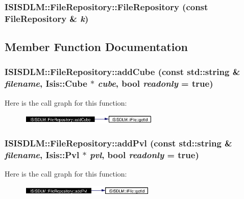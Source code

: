 \subsubsection{\setlength{\rightskip}{0pt plus 5cm}ISISDLM::File\-Repository::File\-Repository (const {\bf File\-Repository} \& {\em k})\hspace{0.3cm}{\tt  [private]}}\label{classISISDLM_1_1FileRepository_d1}




\subsection{Member Function Documentation}
\subsubsection{ ISISDLM::File\-Repository::add\-Cube (const std::string \& {\em filename}, Isis::Cube $\ast$ {\em cube}, bool {\em readonly} = true)}\label{classISISDLM_1_1FileRepository_a1}




Here is the call graph for this function:\begin{figure}[H]
\begin{center}
\leavevmode
\includegraphics[width=187pt]{classISISDLM_1_1FileRepository_a1_cgraph}
\end{center}
\end{figure}
\subsubsection{ ISISDLM::File\-Repository::add\-Pvl (const std::string \& {\em filename}, Isis::Pvl $\ast$ {\em pvl}, bool {\em readonly} = true)}\label{classISISDLM_1_1FileRepository_a2}




Here is the call graph for this function:\begin{figure}[H]
\begin{center}
\leavevmode
\includegraphics[width=182pt]{classISISDLM_1_1FileRepository_a2_cgraph}
\end{center}
\end{figure}
